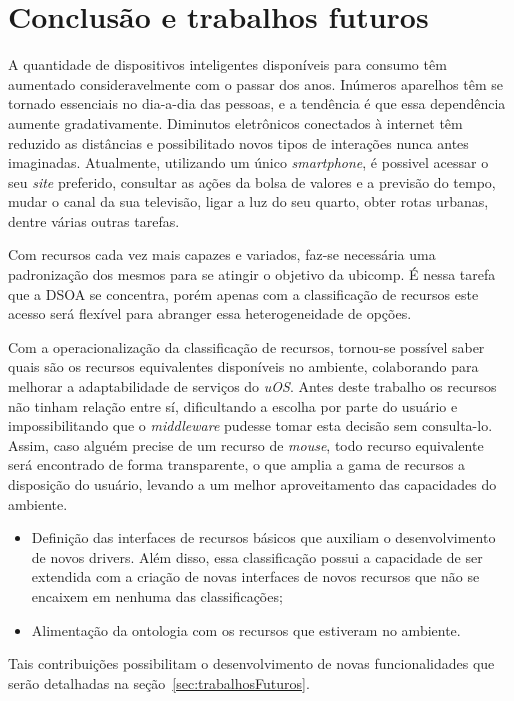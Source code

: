 \chapter{Conclusão e trabalhos futuros}

A quantidade de dispositivos inteligentes disponíveis para consumo têm aumentado consideravelmente com o passar dos anos. Inúmeros aparelhos têm se tornado essenciais no dia-a-dia das pessoas, e a tendência é que essa dependência aumente gradativamente. Diminutos eletrônicos conectados à internet têm reduzido as distâncias e possibilitado novos tipos de interações nunca antes imaginadas. Atualmente, utilizando um único \emph{smartphone}, é possivel acessar o seu \emph{site} preferido, consultar as ações da bolsa de valores e a previsão do tempo, mudar o canal da sua televisão, ligar a luz do seu quarto, obter rotas urbanas, dentre várias outras tarefas.
\begin{comment}
É nesse ambiente cada vez mais ubíquo que a classificação de recursos se insere: ambientes com dispositivos heterogêneos (móveis ou não) interagindo entre si, trocando informações ou utilizando capacidades características de cada aparelho.
\end{comment}

Com recursos cada vez mais capazes e variados, faz-se necessária uma padronização dos mesmos para se atingir o objetivo da ubicomp. É nessa tarefa que a DSOA se concentra, porém apenas com a classificação de recursos este acesso será flexível para abranger essa heterogeneidade de opções.

Com a operacionalização da classificação de recursos, tornou-se possível saber quais são os recursos equivalentes disponíveis no ambiente, colaborando para melhorar a adaptabilidade de serviços do \emph{uOS}. Antes deste trabalho os recursos não tinham relação entre sí, dificultando a escolha por parte do usuário e impossibilitando que o \emph{middleware} pudesse tomar esta decisão sem consulta-lo. Assim, caso alguém precise de um recurso de \emph{mouse}, todo recurso equivalente será encontrado de forma transparente, o que amplia a gama de recursos a disposição do usuário, levando a um melhor aproveitamento das capacidades do ambiente.

\begin{itemize}
	\item Definição das interfaces de recursos básicos que auxiliam o desenvolvimento de novos drivers. Além disso, essa classificação possui a capacidade de ser extendida com a criação de novas interfaces de novos recursos que não se encaixem em nenhuma das classificações;
	\item Alimentação da ontologia com os recursos que estiveram no ambiente.
\end{itemize}

Tais contribuições possibilitam o desenvolvimento de novas funcionalidades que serão detalhadas na seção~\ref{sec:trabalhosFuturos}.

